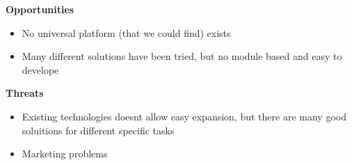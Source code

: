 \textbf{\Large Opportunities}
\begin{itemize}
	 \item No universal platform (that we could find) exists
	 \item Many different solutions have been tried, but no module based and easy to develope
\end{itemize}

\textbf{\Large Threats}
\begin{itemize}
	 \item Existing technologies doesnt allow easy expansion, but there are many good soluitions for different specific tasks
	 \item Marketing problems 
\end{itemize}


